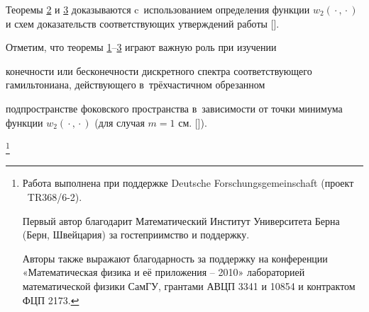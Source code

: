 \smallskip



Теоремы \hyperlink{ras2:thm:2}{2} и \hyperlink{ras2:thm:3}{3} доказываются c~использованием определения функции \mbox{$w_2({}\cdot{}, {}\cdot {})$} и схем доказательств соответствующих утверждений работы [].



Отметим, что теоремы \hyperlink{ras2:thm:1}{1}--\hyperlink{ras2:thm:3}{3}  играют важную роль при изучении

конечности или бесконечности дискретного спектра соответствующего гамильтониана, действующего в~трёхчастичном обрезанном

подпространстве фоковского пространства в~зависимости от точки минимума функции $w_2({}\cdot{}, {}\cdot {})$ (для случая $m=1$ см. []).



\thanks{\noindent Работа выполнена при поддержке Deutsche Forschungsgemeinschaft (проект \No~TR368/6-2).

Первый автор благодарит Математический Институт Университета Берна (Берн, Швейцария) за гостеприимство и поддержку.

Авторы также выражают благодарность за поддержку на конференции «Математическая физика и её приложения – 2010» лабораторией математической физики СамГУ, грантами АВЦП 3341 и 10854 и контрактом ФЦП 2173.}



